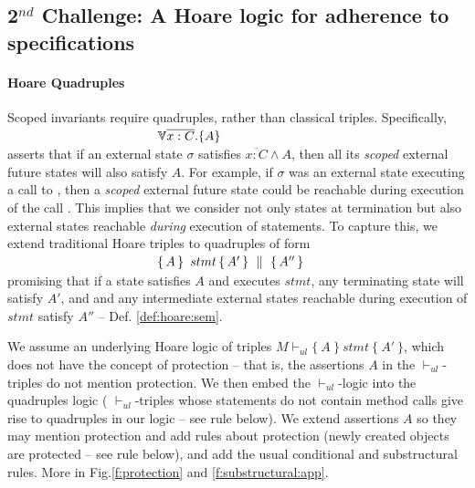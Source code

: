   
  \subsection{2$^{nd}$ Challenge:  A Hoare logic for adherence to specifications}  
 \label{sec:howSecond}

\paragraph{Hoare Quadruples} Scoped invariants require quadruples, rather than  classical triples.
Specifically, \\
  $\strut \ \hspace{4cm} {\TwoStatesN  {\overline{x:C}}  {A}}$\\
 asserts that if an external {state} $\sigma$ 
 satisfies  $\overline {x:C} \wedge A$, then all its \emph{scoped} external future  states will   also  satisfy  $A$. 
For example, if $\sigma$ was an external state executing a call to , then a \emph{scoped} external future  state
 could be reachable during execution of the   call .
This implies that we consider not only states at termination but also external states reachable
 \emph{during} execution of  statements. 
To  capture this, we extend   traditional Hoare triples to quadruples of  form\\
 $\strut \ \hspace{4cm} \quadruple {A} {\, stmt\, }{A'} {A''}$\\  
 promising that if a state satisfies $A$ and executes $stmt$, any terminating state will satisfy $A'$, and 
 and  any intermediate external states reachable during execution of $stmt$ satisfy    $A''$ -- \cf Def. \ref{def:hoare:sem}.
 
\vspace{.1cm}

We assume an  underlying   Hoare logic  of  triples  
$ M \vdash_{ul} \{ \ A\ \} {\ stmt\ }\{\ A'\ \} $,
which does not {have} the concept of protection -- %
that is, the assertions $A$ in the $\vdash_{ul}$-triples do not mention protection.
We then embed  the $\vdash_{ul}$-logic into the quadruples logic 
( $\vdash_{ul}$-triples  whose   statements do not contain method calls give rise to quadruples in our logic -- see rule below).
We  extend assertions $A$ so they may mention protection and add rules about protection
 (\eg newly created objects are protected -- see rule below), and
 add the usual conditional and substructural rules.
 More in Fig.\ref{f:protection}  and \ref{f:substructural:app}.

